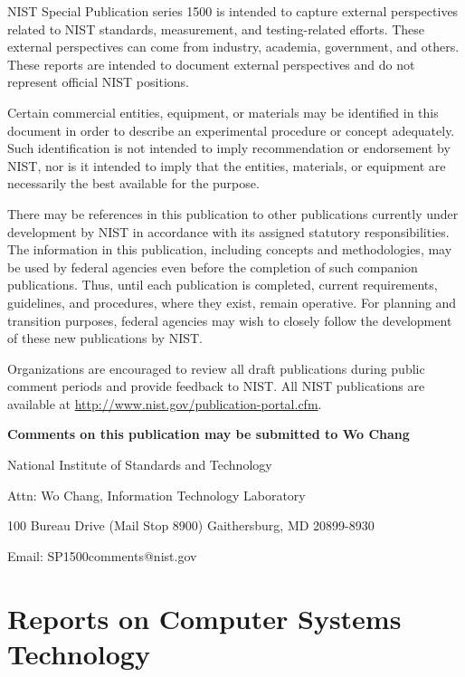 \documentclass[11pt]{article}
\begin{document}
NIST Special Publication series 1500 is intended to capture external perspectives related to NIST 
standards, measurement, and testing-related efforts. These external perspectives can come from 
industry, academia, government, and others. These reports are intended to document external 
perspectives and do not represent official NIST positions.

\begin{mdframed}

Certain commercial entities, equipment, or materials may be identified in this document in order to describe an 
experimental procedure or concept adequately. Such identification is not intended to imply recommendation or 
endorsement by NIST, nor is it intended to imply that the entities, materials, or equipment are necessarily the best 
available for the purpose. 

There may be references in this publication to other publications currently under development by NIST in 
accordance with its assigned statutory responsibilities. The information in this publication, including concepts and 
methodologies, may be used by federal agencies even before the completion of such companion publications. Thus, 
until each publication is completed, current requirements, guidelines, and procedures, where they exist, remain 
operative. For planning and transition purposes, federal agencies may wish to closely follow the development of 
these new publications by NIST. 

Organizations are encouraged to review all draft publications during public comment periods and provide feedback 
to NIST. All NIST publications are available at \url{http://www.nist.gov/publication-portal.cfm}.

\end{mdframed}

\bigskip \bigskip \bigskip

\begin{center}
{\bf Comments on this publication may be submitted to Wo Chang}
\bigskip

National Institute of Standards and Technology

Attn: Wo Chang, Information Technology Laboratory

100 Bureau Drive (Mail Stop 8900) Gaithersburg, MD 20899-8930

Email: SP1500comments@nist.gov 
\end{center}

\newpage

\section*{Reports on Computer Systems Technology}
\end{document}
